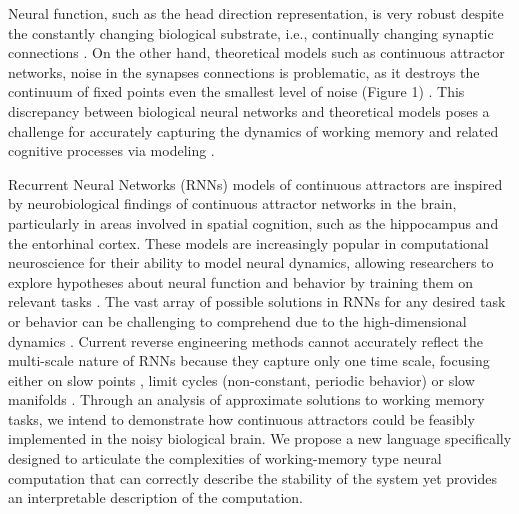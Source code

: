 \documentclass[12pt,letterpaper, onecolumn]{article}
\theoremstyle{definition}
\theoremstyle{remark}
\begin{document}
Neural function, such as the head direction representation, is very robust despite the constantly changing biological substrate, i.e., continually changing synaptic connections \citep{gallego2020, kim2019generation, flesch2023continual}.
On the other hand, theoretical models such as  continuous attractor networks, noise in the synapses connections is problematic, as it destroys the continuum of fixed points even the smallest level of noise (Figure 1) \citep{seung1996, renart2003}.
This discrepancy between biological neural networks and theoretical models poses a challenge for accurately capturing the dynamics of working memory and related cognitive processes via modeling \citep{calaim2022geometry, renart2003, seeholzer2019, machens2008}.

Recurrent Neural Networks (RNNs) models of continuous attractors are inspired by neurobiological findings of continuous attractor networks in the brain, particularly in areas involved in spatial cognition, such as the hippocampus and the entorhinal cortex.
These models are increasingly popular in computational neuroscience for their ability to model neural dynamics, allowing researchers to explore hypotheses about neural function and behavior by training them on relevant tasks \citep{darshan2022, barak2017recurrent, durstewitz2023reconstructing, yang2019task, yang2019multiple, yang2020artificial, jarne2023b, song2016}. %
The vast array of possible solutions in RNNs for any desired task or behavior can be challenging to comprehend due to the high-dimensional dynamics \citep{lipton2018}.
Current reverse engineering methods cannot accurately reflect the multi-scale nature of RNNs because they capture only one time scale, focusing either on slow points \citep{sussillo2013blackbox}, limit cycles (non-constant, periodic behavior) \citep{pals2024, Zhao2016d} or slow manifolds \citep{ghazizadeh2021slow}.
%
Through an analysis of approximate solutions to working memory tasks, we intend to demonstrate how continuous attractors could be feasibly implemented in the noisy biological brain.
We propose a new language specifically designed to articulate the complexities of working-memory type neural computation that can correctly describe the stability of the system yet provides an interpretable description of the computation. 
\end{document}

